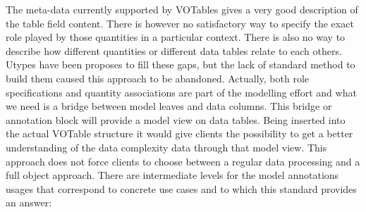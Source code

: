The meta-data currently supported by VOTables gives a very good description of the table field content. 
There is however no satisfactory way to specify the exact role played by those quantities in a particular context.
There is also no way to describe how different quantities or different data tables relate to each others.
Utypes have been proposes to fill these gaps, but the lack of standard method to build them caused this approach to be abandoned.
Actually, both role specifications and quantity associations are part of the modelling effort and what we need is a bridge between model leaves and data columns.
This bridge or annotation block will provide a model view on data tables.
Being inserted into the actual VOTable structure it would give clients the possibility to get a better  understanding of the data complexity data through that model view.
This approach does not force clients to choose between a regular data processing and a full object approach.
There are intermediate levels for the model annotations usages that correspond to concrete use cases and to which this standard provides an answer:


